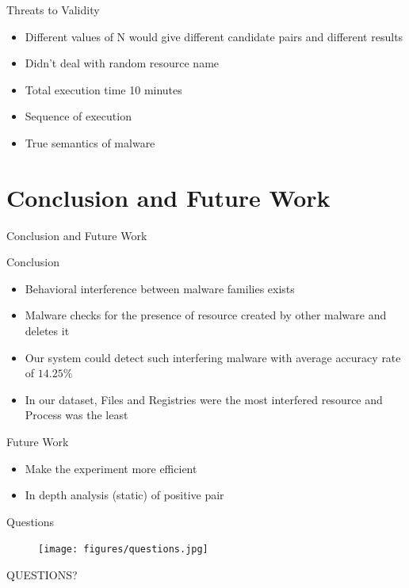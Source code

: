 \documentclass{beamer}
\begin{document}
\begin{frame}[h]{Threats to Validity}
  \begin{itemize}
    \item Different values of N would give different candidate pairs and different results
    \item Didn't deal with random resource name
    \item Total execution time 10 minutes
    \item Sequence of execution
    \item True semantics of malware
  \end{itemize}
\end{frame}

\section{Conclusion and Future Work}
\begin{frame}{Conclusion and Future Work}
  \begin{block}{Conclusion}
  \begin{itemize}
    \item Behavioral interference between malware families exists
    \item Malware checks for the presence of resource created by other malware and deletes it
    \item Our system could detect such interfering malware with average accuracy rate of $14.25\%$
    \item In our dataset, Files and Registries were the most interfered resource and Process was the least
  \end{itemize}
  \end{block}
  \begin{block}{Future Work}
  \begin{itemize}
    \item Make the experiment more efficient
    \item In depth analysis (static) of positive pair
  \end{itemize}
  \end{block}
\end{frame}
\begin{frame}[plain,c]{Questions}
  \begin{figure}[H]
    \centering
    \texttt{[image: figures/questions.jpg]}
  \end{figure}
  \begin{center}
    \Huge QUESTIONS?\@
  \end{center}
\end{frame}
\end{document}

